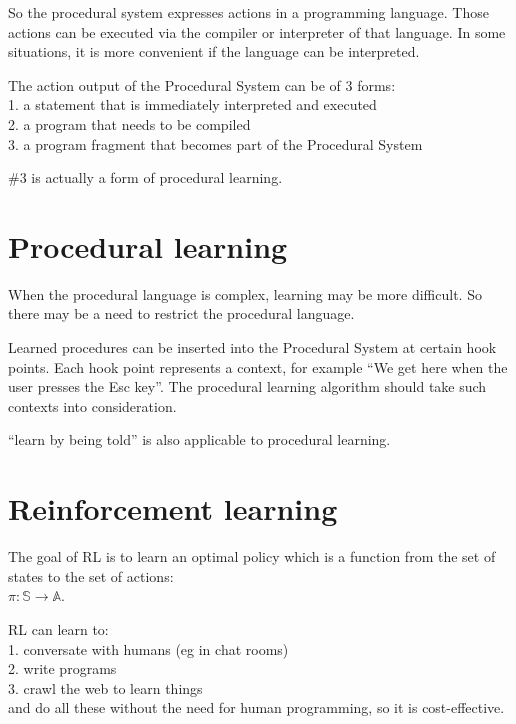 So the procedural system expresses actions in a programming language.  Those actions can be executed via the compiler or interpreter of that language.  In some situations, it is more convenient if the language can be interpreted.

The action output of the Procedural System can be of 3 forms:\\
1. a statement that is immediately interpreted and executed\\
2. a program that needs to be compiled\\
3. a program fragment that becomes part of the Procedural System

\#3 is actually a form of procedural learning.

\section{Procedural learning}
\label{sec:ProceduralLearning}

When the procedural language is complex, learning may be more difficult.  So there may be a need to restrict the procedural language.  %

Learned procedures can be inserted into the Procedural System at certain hook points.  Each hook point represents a context, for example ``We get here when the user presses the Esc key''.  The procedural learning algorithm should take such contexts into consideration.

``learn by being told'' is also applicable to procedural learning.

\section{Reinforcement learning} 
\label{sec:RL}

The goal of RL is to learn an optimal policy which is a function from the set of states to the set of actions:\\
\hspace*{1cm} $\pi: \mathbb{S} \rightarrow \mathbb{A}$.

RL can learn to:\\
1.  conversate with humans (eg in chat rooms)\\
2.  write programs\\
3.  crawl the web to learn things\\
and do all these without the need for human programming, so it is cost-effective.

